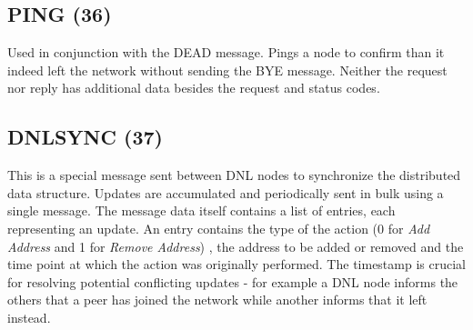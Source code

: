 \begin{figure}[H]
    \centering
\end{figure}

\subsection{PING (36)}

Used in conjunction with the DEAD message. Pings a node to confirm than it 
indeed left the network without sending the BYE message. Neither the request 
nor reply has additional data besides the request and status codes.

\subsection{DNLSYNC (37)}

This is a special message sent between DNL nodes to synchronize the distributed 
data structure. Updates are accumulated and periodically sent in bulk using a 
single message. The message data itself contains a list of entries, each 
representing an update. An entry contains the type of the action (0 for 
\textit{Add Address} and 1 for \textit{Remove Address}) , the address to be 
added or removed and the time point at which the action was originally 
performed. The timestamp is crucial for resolving potential conflicting updates 
- for example a DNL node informs the others that a peer has joined the network 
while another informs that it left instead.

\begin{figure}[H]
    \centering
\end{figure}
